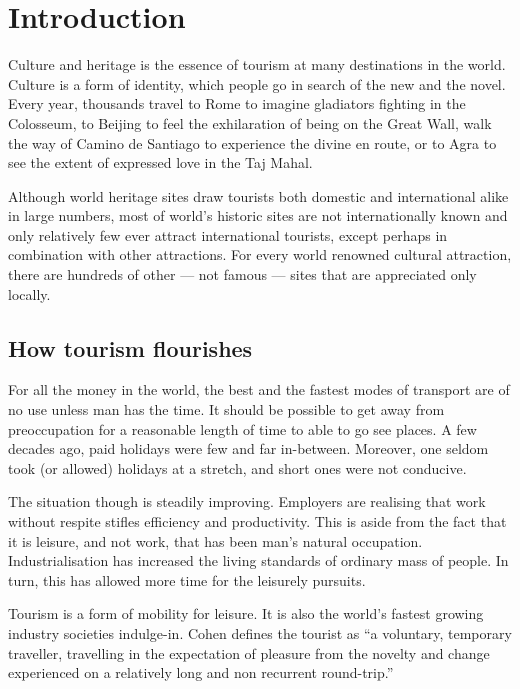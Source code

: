 \chapter{Introduction} %
\label{cha:intro}


Culture and heritage is the essence of tourism at many destinations in the world. Culture is a form of identity, which people go in search of the new and the novel. Every year, thousands travel to Rome to imagine gladiators fighting in the Colosseum, to Beijing to feel the exhilaration of being on the Great Wall, walk the way of Camino de Santiago to experience the divine en route, or to Agra to see the extent of expressed love in the Taj Mahal.

Although world heritage sites draw tourists both domestic and international alike in large numbers, most of world's historic sites are not internationally known and only relatively few ever attract international tourists, except perhaps in combination with other attractions. For every world renowned cultural attraction, there are hundreds of other --- not famous --- sites that are appreciated only locally.

\section{How tourism flourishes} %
\label{sec:htf}

For all the money in the world, the best and the fastest modes of transport are of no use unless man has the time. It should be possible to get away from preoccupation for a reasonable length of time to able to go see places. A few decades ago, paid holidays were few and far in-between. Moreover, one seldom took (or allowed) holidays at a stretch, and short ones were not conducive.

The situation though is steadily improving. Employers are realising that work without respite stifles efficiency and productivity. This is aside from the fact that it is leisure, and not work, that has been man's natural occupation. Industrialisation has increased the living standards of ordinary mass of people. In turn, this has allowed more time for the leisurely pursuits.

Tourism is a form of mobility for leisure. It is also the world's fastest growing industry societies indulge-in. Cohen defines the tourist as ``a voluntary, temporary traveller, travelling in the expectation of pleasure from the novelty and change experienced on a relatively long and non recurrent round-trip.''

